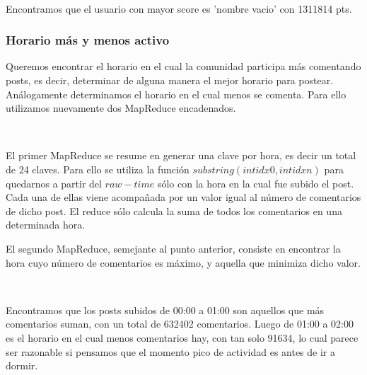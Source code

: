~

Encontramos que el usuario con mayor score es 'nombre vacio' con 1311814 pts.

\subsubsection{Horario más y menos activo}

Queremos encontrar el horario en el cual la comunidad participa más comentando posts, es decir, determinar de alguna manera el mejor horario para postear. Análogamente determinamos el horario en el cual menos se comenta. Para ello utilizamos nuevamente dos MapReduce encadenados.

~

El primer MapReduce se resume en generar una clave por hora, es decir un total de 24 claves. Para ello se utiliza la función $substring(int idx0, int idxn)$ para quedarnos a partir del $raw-time$ sólo con la hora en la cual fue subido el post. Cada una de ellas viene acompa\~nada por un valor igual al número de comentarios de dicho post. El reduce sólo calcula la suma de todos los comentarios en una determinada hora.

El segundo MapReduce, semejante al punto anterior, consiste en encontrar la hora cuyo número de comentarios es máximo, y aquella que minimiza dicho valor.

~

Encontramos que los posts subidos de 00:00 a 01:00 son aquellos que más comentarios suman, con un total de 632402 comentarios. Luego de 01:00 a 02:00 es el horario en el cual menos comentarios hay, con tan solo 91634, lo cual parece ser razonable si pensamos que el momento pico de actividad es antes de ir a dormir.
